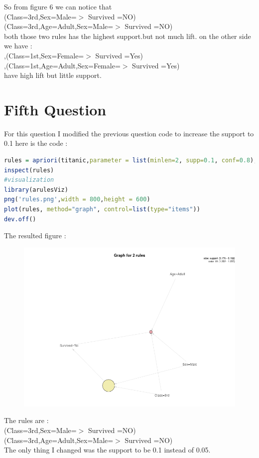 \documentclass{article}
\begin{document}
So from figure 6 we can notice that\\ (Class=3rd,Sex=Male=\(>\) Survived =NO)\\ (Class=3rd,Age=Adult,Sex=Male=\(>\) Survived =NO) \\both those two rules has the highest support.but not much lift. on the other side we have :\\
,(Class=1st,Sex=Female=\(>\) Survived =Yes)\\
,(Class=1st,Age=Adult,Sex=Female=\(>\) Survived =Yes)\\
have high lift but little support.
	\section*{Fifth Question}
For this question I modified the previous question code to increase the support to 0.1 here is the code : 
\begin{lstlisting}[language=R]
rules = apriori(titanic,parameter = list(minlen=2, supp=0.1, conf=0.8),appearance = list(rhs=c("Survived=No", "Survived=Yes"),default="lhs"))
inspect(rules)
#visualization
library(arulesViz)
png('rules.png',width = 800,height = 600)
plot(rules, method="graph", control=list(type="items"))
dev.off()
\end{lstlisting}
The resulted figure :
\begin{figure}[H]
\includegraphics[scale = 0.6]{Q5rules.png}
\end{figure}
The rules are : \\
(Class=3rd,Sex=Male=\(>\) Survived =NO)\\ (Class=3rd,Age=Adult,Sex=Male=\(>\) Survived =NO) \\
The only thing  I changed was the support to be 0.1 instead of 0.05.
\end{document}
